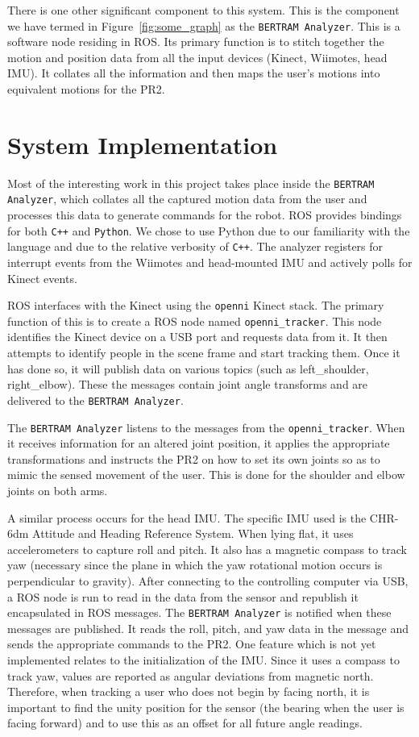 \documentclass{sig-alternate}
\begin{document}
There is one other significant component to this system. This is the
component we have
termed in Figure~\ref{fig:some_graph} as the {\tt BERTRAM Analyzer}. This is a 
software node residing in ROS. Its primary function is to stitch together the
motion and position data from all the input devices (Kinect, Wiimotes, head 
IMU). It collates all the information and then maps the user's motions
into equivalent motions for the PR2.
\section{System Implementation}
Most of the interesting work in this project takes place inside the
{\tt BERTRAM Analyzer}, which collates all the captured motion data from the
user and processes this data to generate commands for the robot. ROS provides
bindings for both {\tt C++} and {\tt Python}. We chose to use Python due to our
familiarity with the language and due to the relative verbosity of {\tt C++}.
The analyzer registers for interrupt events from the Wiimotes and head-mounted
IMU and actively polls for Kinect events.

ROS interfaces with the Kinect using the {\tt openni} Kinect stack. The primary
function of this is to create a ROS node named {\tt openni\_tracker}. This
node identifies the Kinect device on a USB port and requests data
from it. It then attempts to identify people in the scene frame and start
tracking them. Once it has done so, it will publish data on various
topics (such as left\_shoulder, right\_elbow). These the messages contain
joint angle transforms and are delivered to the {\tt BERTRAM Analyzer}.

The {\tt BERTRAM Analyzer} listens to the messages from the
 {\tt openni\_tracker}.
When it receives information for an altered joint position, it applies the
appropriate transformations and instructs the PR2 on how to set its own joints
so as to mimic the sensed movement of the user. This is done for the shoulder
and elbow joints on both arms.

A similar process occurs for the head IMU. The specific IMU used is
the CHR-6dm Attitude and Heading Reference System. When lying flat, it uses
accelerometers to capture roll and pitch. It also has a magnetic compass to 
track yaw (necessary since the plane in which the yaw rotational motion occurs
is perpendicular to gravity). After connecting to the controlling computer via 
USB, a ROS node is run to read in the data from the sensor and republish it
encapsulated in ROS messages. The {\tt BERTRAM Analyzer} is notified when these
messages are published. It reads the roll, pitch, and yaw data in the message
and sends the appropriate commands to the PR2. One feature which is not yet
implemented relates to the initialization of the IMU. Since it uses a compass
to track yaw, values are reported as angular deviations from magnetic north.
Therefore, when tracking a user who does not begin by facing north, it is 
important to find the unity position for the sensor (the bearing when 
the user is facing forward) and to use this as an offset for all future angle
readings.
\end{document}
